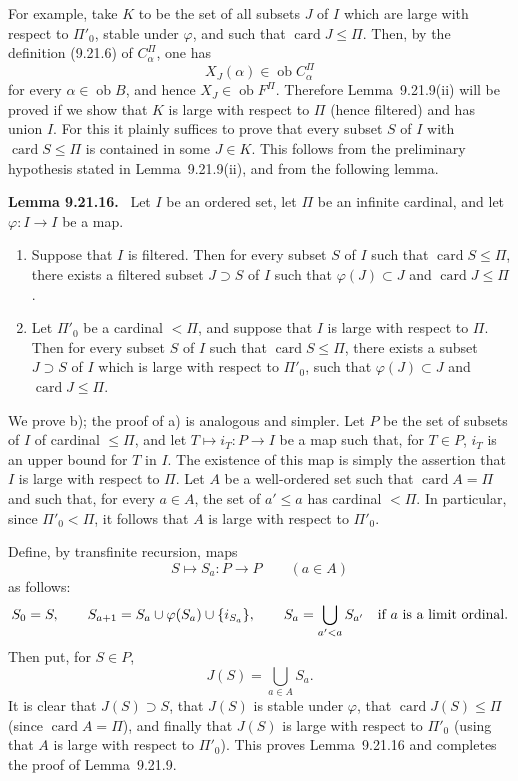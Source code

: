\documentclass[11pt]{article}
\newcommand{\ob}{\operatorname{ob}}
\newcommand{\card}{\operatorname{card}}
\newenvironment{statement}[1]{\par\medskip\noindent\textbf{#1.}\ }{\par\medskip}
\begin{document}
For example, take $K$ to be the set of all subsets $J$ of $I$ which are large with respect to $\Pi'_0$, stable under $\varphi$, and such that $\card J\leq\Pi$. Then, by the definition (9.21.6) of $C^\Pi_\alpha$, one has
\[
 X_J(\alpha)\in\ob C^\Pi_\alpha
\]
for every $\alpha\in\ob B$, and hence $X_J\in\ob F^\Pi$. Therefore Lemma~9.21.9(ii) will be proved if we show that $K$ is large with respect to $\Pi$ (hence filtered) and has union $I$. For this it plainly suffices to prove that every subset $S$ of $I$ with $\card S\leq\Pi$ is contained in some $J\in K$. This follows from the preliminary hypothesis stated in Lemma~9.21.9(ii), and from the following lemma.

\begin{statement}{Lemma 9.21.16}
Let $I$ be an ordered set, let $\Pi$ be an infinite cardinal, and let $\varphi:I\to I$ be a map.
\begin{enumerate}[label=\alph*)]
\item Suppose that $I$ is filtered. Then for every subset $S$ of $I$ such that $\card S\leq\Pi$, there exists a filtered subset $J\supset S$ of $I$ such that $\varphi(J)\subset J$ and $\card J\leq\Pi$.
\item Let $\Pi'_0$ be a cardinal $<\Pi$, and suppose that $I$ is large with respect to $\Pi$. Then for every subset $S$ of $I$ such that $\card S\leq\Pi$, there exists a subset $J\supset S$ of $I$ which is large with respect to $\Pi'_0$, such that $\varphi(J)\subset J$ and $\card J\leq\Pi$.
\end{enumerate}
\end{statement}

We prove b); the proof of a) is analogous and simpler. Let $P$ be the set of subsets of $I$ of cardinal $\leq\Pi$, and let $T\mapsto i_T:P\to I$ be a map such that, for $T\in P$, $i_T$ is an upper bound for $T$ in $I$. The existence of this map is simply the assertion that $I$ is large with respect to $\Pi$. Let $A$ be a well-ordered set such that $\card A=\Pi$ and such that, for every $a\in A$, the set of $a'\leq a$ has cardinal $<\Pi$. In particular, since $\Pi'_0<\Pi$, it follows that $A$ is large with respect to $\Pi'_0$.

Define, by transfinite recursion, maps
\[
 S\longmapsto S_a:P\to P\qquad (a\in A)
\]
as follows:
\[
 S_0=S,\qquad
 S_{a+1}=S_a\cup\varphi(S_a)\cup\{i_{S_a}\},\qquad
 S_a=\bigcup_{a'<a}S_{a'} \quad\hbox{if }a\hbox{ is a limit ordinal}.
\]
Then put, for $S\in P$,
\[
 J(S)=\bigcup_{a\in A}S_a.
\]
It is clear that $J(S)\supset S$, that $J(S)$ is stable under $\varphi$, that $\card J(S)\leq\Pi$ (since $\card A=\Pi$), and finally that $J(S)$ is large with respect to $\Pi'_0$ (using that $A$ is large with respect to $\Pi'_0$). This proves Lemma~9.21.16 and completes the proof of Lemma~9.21.9.
\end{document}
